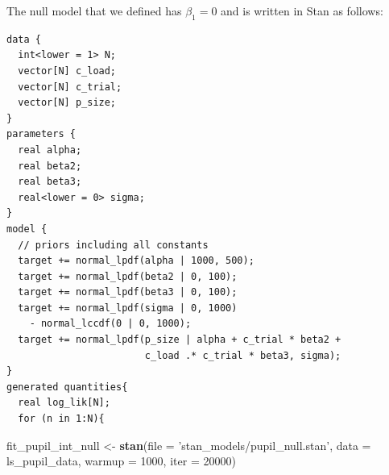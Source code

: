\documentclass[12pt,]{krantz}
\newenvironment{Shaded}{\begin{snugshade}}{\end{snugshade}}
\newcommand{\DataTypeTok}[1]{\textcolor[rgb]{0.13,0.29,0.53}{#1}}
\newcommand{\DecValTok}[1]{\textcolor[rgb]{0.00,0.00,0.81}{#1}}
\newcommand{\KeywordTok}[1]{\textcolor[rgb]{0.13,0.29,0.53}{\textbf{#1}}}
\newcommand{\NormalTok}[1]{#1}
\newcommand{\OperatorTok}[1]{\textcolor[rgb]{0.81,0.36,0.00}{\textbf{#1}}}
\newcommand{\StringTok}[1]{\textcolor[rgb]{0.31,0.60,0.02}{#1}}
\theoremstyle{definition}
\theoremstyle{definition}
\theoremstyle{definition}
\theoremstyle{remark}
\begin{document}
\begin{Shaded}
\end{Shaded}

The null model that we defined has \(\beta_1 = 0\) and is written in Stan as follows:

\begin{verbatim}
data {
  int<lower = 1> N;
  vector[N] c_load;
  vector[N] c_trial;
  vector[N] p_size;
}
parameters {
  real alpha;
  real beta2;
  real beta3;
  real<lower = 0> sigma;
}
model {
  // priors including all constants
  target += normal_lpdf(alpha | 1000, 500);
  target += normal_lpdf(beta2 | 0, 100);
  target += normal_lpdf(beta3 | 0, 100);
  target += normal_lpdf(sigma | 0, 1000)
    - normal_lccdf(0 | 0, 1000);
  target += normal_lpdf(p_size | alpha + c_trial * beta2 +
                        c_load .* c_trial * beta3, sigma);
}
generated quantities{
  real log_lik[N];
  for (n in 1:N){
\end{verbatim}

\begin{Shaded}
\begin{Highlighting}[]
\NormalTok{fit_pupil_int_null <-}\StringTok{ }\KeywordTok{stan}\NormalTok{(}\DataTypeTok{file =} \StringTok{'stan_models/pupil_null.stan'}\NormalTok{,}
                          \DataTypeTok{data =}\NormalTok{ ls_pupil_data,}
                          \DataTypeTok{warmup =} \DecValTok{1000}\NormalTok{,}
                          \DataTypeTok{iter =} \DecValTok{20000}\NormalTok{)}
\end{Highlighting}
\end{Shaded}
\end{document}
